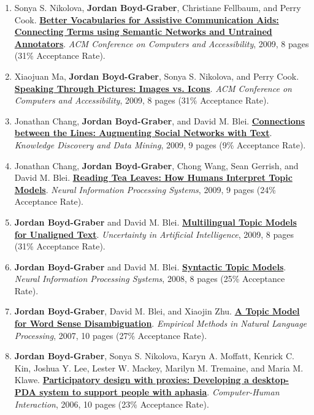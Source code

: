 {\begin{enumerate}
	 \item Sonya S. Nikolova, {\bf Jordan Boyd-Graber}, Christiane Fellbaum, and Perry Cook.  {\bf \href{http://cs.umd.edu/~jbg//docs/evocation-viva.pdf}{Better Vocabularies for Assistive Communication Aids: Connecting Terms using Semantic Networks and Untrained Annotators}}.  \emph{ACM Conference on Computers and Accessibility}, 2009, 8 pages (31\% Acceptance Rate).

	 \item Xiaojuan Ma, {\bf Jordan Boyd-Graber}, Sonya S. Nikolova, and Perry Cook.  {\bf \href{http://cs.umd.edu/~jbg//docs/image_icon.pdf}{Speaking Through Pictures: Images vs. Icons}}.  \emph{ACM Conference on Computers and Accessibility}, 2009, 8 pages (31\% Acceptance Rate).

	 \item Jonathan Chang, {\bf Jordan Boyd-Graber}, and David M. Blei.  {\bf \href{http://cs.umd.edu/~jbg//docs/kdd2009.pdf}{Connections between the Lines: Augmenting Social Networks with Text}}.  \emph{Knowledge Discovery and Data Mining}, 2009, 9 pages (9\% Acceptance Rate).

	 \item Jonathan Chang, {\bf Jordan Boyd-Graber}, Chong Wang, Sean Gerrish, and David M. Blei.  {\bf \href{http://cs.umd.edu/~jbg//docs/nips2009-rtl.pdf}{Reading Tea Leaves: How Humans Interpret Topic Models}}.  \emph{Neural Information Processing Systems}, 2009, 9 pages (24\% Acceptance Rate).

	 \item {\bf Jordan Boyd-Graber} and David M. Blei.  {\bf \href{http://cs.umd.edu/~jbg//docs/uai2009.pdf}{Multilingual Topic Models for Unaligned Text}}.  \emph{Uncertainty in Artificial Intelligence}, 2009, 8 pages (31\% Acceptance Rate).

	 \item {\bf Jordan Boyd-Graber} and David M. Blei.  {\bf \href{http://cs.umd.edu/~jbg//docs/nips2008.pdf}{Syntactic Topic Models}}.  \emph{Neural Information Processing Systems}, 2008, 8 pages (25\% Acceptance Rate).

	 \item {\bf Jordan Boyd-Graber}, David M. Blei, and Xiaojin Zhu.  {\bf \href{http://cs.umd.edu/~jbg//docs/jbg-EMNLP07.pdf}{A Topic Model for Word Sense Disambiguation}}.  \emph{Empirical Methods in Natural Language Processing}, 2007, 10 pages (27\% Acceptance Rate).

	 \item {\bf Jordan Boyd-Graber}, Sonya S. Nikolova, Karyn A. Moffatt, Kenrick C. Kin, Joshua Y. Lee, Lester W. Mackey, Marilyn M. Tremaine, and Maria M. Klawe.  {\bf \href{http://cs.umd.edu/~jbg//docs/paper673-boyd-graber.pdf}{Participatory design with proxies: {D}eveloping a desktop-{PDA} system to support people with aphasia}}.  \emph{Computer-Human Interaction}, 2006, 10 pages (23\% Acceptance Rate).


\end{enumerate}}
